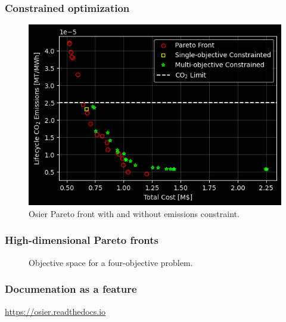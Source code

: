 \begin{frame}
    \frametitle{Constrained optimization}

        \begin{figure}
            \centering
            \includegraphics[width=0.85\columnwidth]{images/osier_constraint.png}
            \caption{Osier Pareto front with and without emissions constraint.}
        \end{figure}
\end{frame}

\begin{frame}
    \frametitle{High-dimensional Pareto fronts}
    \begin{figure}
        \centering
        \resizebox{\columnwidth}{!}{}
        \caption{Objective space for a four-objective problem.}
        \label{fig:4-obj-space}
    \end{figure}
\end{frame}


\begin{frame}
    \frametitle{Documenation as a feature}
    \url{https://osier.readthedocs.io}
\end{frame}


